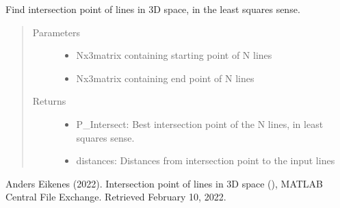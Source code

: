 \documentclass[letterpaper,10pt,english]{sphinxmanual}
\begin{document}
\label{\detokenize{ExperimentsPlannification:module-modules}}

\begin{fulllineitems}
\label{\detokenize{ExperimentsPlannification:modules.lineIntersect3D}}
\sphinxAtStartPar
Find intersection point of lines in 3D space, in the least squares sense.
\begin{quote}\begin{description}
\item[{Parameters}] \leavevmode\begin{itemize}
\item {} 
\sphinxAtStartPar
{} \textendash{} Nx3\sphinxhyphen{}matrix containing starting point of N lines

\item {} 
\sphinxAtStartPar
{} \textendash{} Nx3\sphinxhyphen{}matrix containing end point of N lines

\end{itemize}

\item[{Returns}] \leavevmode
\sphinxAtStartPar
\begin{itemize}
\item {} 
\sphinxAtStartPar
P\_Intersect: Best intersection point of the N lines, in least squares sense.

\item {} 
\sphinxAtStartPar
distances: Distances from intersection point to the input lines

\end{itemize}


\end{description}\end{quote}

\sphinxAtStartPar
Anders Eikenes (2022). Intersection point of lines in 3D space (), MATLAB Central File Exchange. Retrieved February 10, 2022.

\end{fulllineitems}

\label{\detokenize{ExperimentsPlannification:module-modules}}
\end{document}

